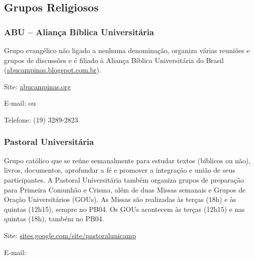 \subsection{Grupos Religiosos}

\subsubsection{ABU -- Aliança Bíblica Universitária}

Grupo evangélico não ligado a nenhuma denominação, organiza várias reuniões e
grupos de discussões e é filiado à Aliança Bíblica Universitária do Brasil
(\url{abucampinas.blogspot.com.br}).

\begin{compactitemize}
    \item Site: \url{abucampinas.org}
    \item E-mail:  ou
    \item Telefone: (19) 3289-2823
\end{compactitemize}

\subsubsection{Pastoral Universitária}

Grupo católico que se reúne semanalmente para estudar textos (bíblicos ou não),
livros, documentos, aprofundar a fé e promover a integração e união de seus
participantes. A Pastoral Universitária também organiza grupos de preparação
para Primeira Comunhão e Crisma, além de duas Missas semanais e Grupos de Oração
Universitários (GOUs). As Missas são realizadas às terças (18h) e às quintas
(12h15), sempre no PB04. Os GOUs acontecem às terças (12h15) e nas quintas
(18h), também no PB04.

\begin{compactitemize}
    \item Site: \url{sites.google.com/site/pastoralunicamp}
    \item E-mail: 
\end{compactitemize}
